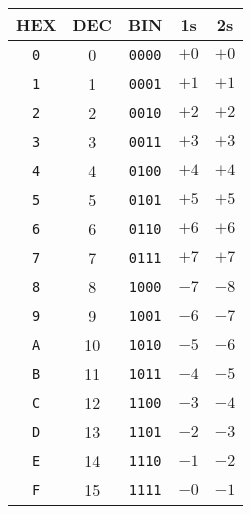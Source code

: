 \begin{tabular}{ccccc}
    \toprule
    HEX        & DEC & BIN           & 1s   & 2s   \\
    \midrule
    \texttt{0} & 0   & \texttt{0000} & $+0$ & $+0$ \\
    \texttt{1} & 1   & \texttt{0001} & $+1$ & $+1$ \\
    \texttt{2} & 2   & \texttt{0010} & $+2$ & $+2$ \\
    \texttt{3} & 3   & \texttt{0011} & $+3$ & $+3$ \\
    \texttt{4} & 4   & \texttt{0100} & $+4$ & $+4$ \\
    \texttt{5} & 5   & \texttt{0101} & $+5$ & $+5$ \\
    \texttt{6} & 6   & \texttt{0110} & $+6$ & $+6$ \\
    \texttt{7} & 7   & \texttt{0111} & $+7$ & $+7$ \\
    \texttt{8} & 8   & \texttt{1000} & $-7$ & $-8$ \\
    \texttt{9} & 9   & \texttt{1001} & $-6$ & $-7$ \\
    \texttt{A} & 10  & \texttt{1010} & $-5$ & $-6$ \\
    \texttt{B} & 11  & \texttt{1011} & $-4$ & $-5$ \\
    \texttt{C} & 12  & \texttt{1100} & $-3$ & $-4$ \\
    \texttt{D} & 13  & \texttt{1101} & $-2$ & $-3$ \\
    \texttt{E} & 14  & \texttt{1110} & $-1$ & $-2$ \\
    \texttt{F} & 15  & \texttt{1111} & $-0$ & $-1$ \\
    \bottomrule
\end{tabular}
